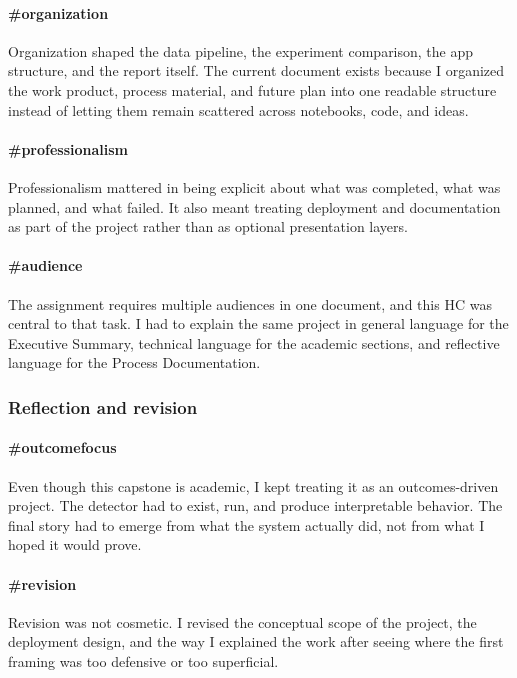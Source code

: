 \documentclass[11pt]{article}
\begin{document}
\paragraph{\#organization}
Organization shaped the data pipeline, the experiment comparison, the app structure, and the report itself. The current document exists because I organized the work product, process material, and future plan into one readable structure instead of letting them remain scattered across notebooks, code, and ideas.

\paragraph{\#professionalism}
Professionalism mattered in being explicit about what was completed, what was planned, and what failed. It also meant treating deployment and documentation as part of the project rather than as optional presentation layers.

\paragraph{\#audience}
The assignment requires multiple audiences in one document, and this HC was central to that task. I had to explain the same project in general language for the Executive Summary, technical language for the academic sections, and reflective language for the Process Documentation.

\subsubsection*{Reflection and revision}
\paragraph{\#outcomefocus}
Even though this capstone is academic, I kept treating it as an outcomes-driven project. The detector had to exist, run, and produce interpretable behavior. The final story had to emerge from what the system actually did, not from what I hoped it would prove.

\paragraph{\#revision}
Revision was not cosmetic. I revised the conceptual scope of the project, the deployment design, and the way I explained the work after seeing where the first framing was too defensive or too superficial.
\end{document}
